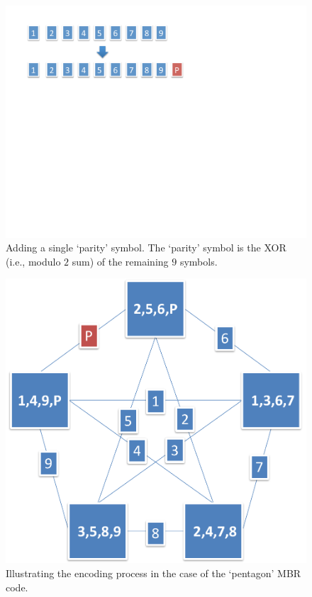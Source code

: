   \begin{figure}[h!]
  \centering
     \includegraphics[scale=.45]{src/Figures/chap4/pentagon_0}
      \caption{Adding a single `parity' symbol.  The `parity' symbol is the XOR (i.e., modulo $2$ sum) of the remaining $9$ symbols.}  \label{fig:pentagon_0}    
     \end{figure}
  \begin{figure}[h!]
  \centering
     \includegraphics[scale=.35]{src/Figures/chap4/pentagon}  
      \caption{Illustrating the encoding process in the case of the `pentagon' MBR code.}  \label{fig:pentagon}    
     \end{figure}     

